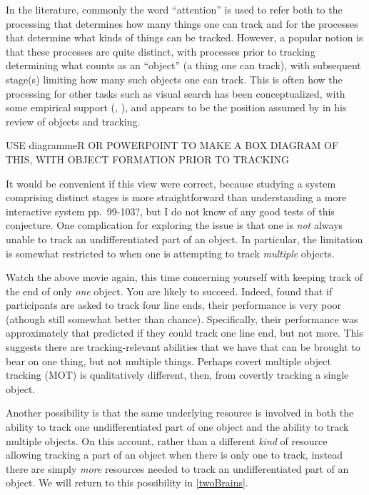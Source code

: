 \documentclass[]{book}
\begin{document}
In the literature, commonly the word ``attention'' is used to refer both to the processing that determines how many things one can track and for the processes that determine what kinds of things can be tracked. However, a popular notion is that these processes are quite distinct, with processes prior to tracking determining what counts as an ``object'' (a thing one can track), with subsequent stage(s) limiting how many such objects one can track. This is often how the processing for other tasks such as visual search has been conceptualized, with some empirical support (\citet{wolfePreattentiveObjectFiles1997}, \citet{nakayamaVisualSurfaceRepresentation1995}), and appears to be the position assumed by \citep{schollObjectsAttentionState2001} in his review of objects and tracking.

USE diagrammeR OR POWERPOINT TO MAKE A BOX DIAGRAM OF THIS, WITH OBJECT FORMATION PRIOR TO TRACKING

It would be convenient if this view were correct, because studying a system comprising distinct stages is more straightforward than understanding a more interactive system \citet{simonSciencesArtificialReissue1969} pp.~99-103?, but I do not know of any good tests of this conjecture. One complication for exploring the issue is that one is \emph{not} always unable to track an undifferentiated part of an object. In particular, the limitation is somewhat restricted to when one is attempting to track \emph{multiple} objects.

Watch the above movie again, this time concerning yourself with keeping track of the end of only \emph{one} object. You are likely to succeed. Indeed, \citet{schollObjectsAttentionState2001} found that if participants are asked to track four line ends, their performance is very poor (athough still somewhat better than chance). Specifically, their performance was approximately that predicted if they could track one line end, but not more. This suggests there are tracking-relevant abilities that we have that can be brought to bear on one thing, but not multiple things. Perhaps covert multiple object tracking (MOT) is qualitatively different, then, from covertly tracking a single object.

Another possibility is that the same underlying resource is involved in both the ability to track one undifferentiated part of one object and the ability to track multiple objects. On this account, rather than a different \emph{kind} of resource allowing tracking a part of an object when there is only one to track, instead there are simply \emph{more} resources needed to track an undifferentiated part of an object. We will return to this possibility in \ref{twoBrains}.
\end{document}
